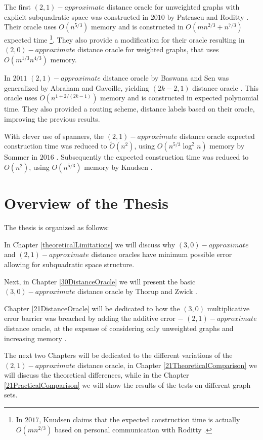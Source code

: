\documentclass[shortabstract, lic, english]{iithesis}
\theoremstyle{definition} \newtheorem{definition}{Definition}[chapter]
\theoremstyle{plain} \newtheorem{remark}[definition]{Observation}
\theoremstyle{plain} \newtheorem{theorem}[definition]{Theorem}
\theoremstyle{plain} \newtheorem{lemma}[definition]{Lemma}
\theoremstyle{plain} \newtheorem{conjecture}[definition]{Conjecture}
\begin{document}
The first $(2,1)-approximate$ distance oracle for unweighted graphs with explicit subquadratic space was constructed in $2010$ by Patrascu and Roditty \cite{21OracleLessMemory}.
Their oracle uses $O(n^{5/3})$ memory and is constructed in $O(mn^{2/3} + n^{7/3})$ expected time
\footnote{In $2017$, Knudsen claims that the expected construction time is actually $O(mn^{2/3})$ based on personal communication with Roditty \cite[Chapter 4, Lemma 10]{21OracleSpannerNoPenaltyNoLog}.}.
They also provide a modification for their oracle resulting in $(2,0)-approximate$ distance oracle for weighted graphs, that uses $O(m^{1/3}n^{4/3})$ memory.

In $2011$ $(2,1)-approximate$ distance oracle by Baswana and Sen was generalized by Abraham and Gavoille, yielding $(2k-2, 1)$ distance oracle \cite{a1Oracle}.
This oracle uses $\tilde{O}(n^{1 + 2/(2k-1)})$ memory and is constructed in expected polynomial time.
They also provided a routing scheme, distance labels based on their oracle, improving the previous results.

With clever use of spanners, the $(2,1)-approximate$ distance oracle expected construction time was reduced to $\tilde{O}(n^2)$, using $O(n^{5/3}\log ^2 n)$ memory by Sommer in $2016$ \cite{21OracleSpannerNoPenalty}.
Subsequently the expected construction time was reduced to $O(n^2)$, using $O(n^{5/3})$ memory by Knudsen \cite{21OracleSpannerNoPenaltyNoLog}.

\section{Overview of the Thesis}
The thesis is organized as follows:

In Chapter \ref{theoreticalLimitations} we will discuss why $(3,0)-approximate$ and $(2,1)-approximate$ distance oracles
have minimum possible error allowing for subquadratic space structure.

Next, in Chapter \ref{30DistanceOracle} we will present the basic $(3,0)-approximate$ distance oracle by Thorup and Zwick \cite{a0OraclesBasic}.

Chapter \ref{21DistanceOracle} will be dedicated to how the $(3,0)$ multiplicative error barrier was breached by adding the additive error $-$
$(2,1)-approximate$ distance oracle, at the expense of considering only unweighted graphs and increasing memory \cite{21OracleBasic}.

The next two Chapters will be dedicated to the different variations of the $(2,1)-approximate$ distance oracle,
in Chapter \ref{21TheoreticalComparison} we will discuss the theoretical differences,
while in the Chapter \ref{21PracticalComparison} we will show the results of the tests on different graph sets.
\end{document}
